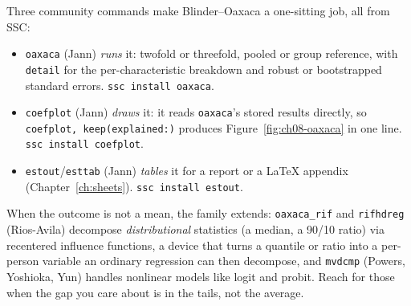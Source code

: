\documentclass[
    a4paper,
    fontsize=10pt,
    twoside=true,
    numbers=noenddot,
]{kaobook}
\begin{document}
\begin{kaobox}[frametitle={SSC toolkit: running, interpreting, and drawing a decomposition}]
Three community commands make Blinder--Oaxaca a one-sitting job, all from SSC:
\begin{itemize}
    \item \texttt{oaxaca} (Jann) \emph{runs} it: twofold or threefold, pooled or group reference, with \texttt{detail} for the per-characteristic breakdown and robust or bootstrapped standard errors. \texttt{ssc install oaxaca}.
    \item \texttt{coefplot} (Jann) \emph{draws} it: it reads \texttt{oaxaca}'s stored results directly, so \texttt{coefplot, keep(explained:)} produces Figure~\ref{fig:ch08-oaxaca} in one line. \texttt{ssc install coefplot}.
    \item \texttt{estout}/\texttt{esttab} (Jann) \emph{tables} it for a report or a \LaTeX{} appendix (Chapter~\ref{ch:sheets}). \texttt{ssc install estout}.
\end{itemize}
When the outcome is not a mean, the family extends: \texttt{oaxaca\_rif} and \texttt{rifhdreg} (Rios-Avila) decompose \emph{distributional} statistics (a median, a 90/10 ratio) via recentered influence functions, a device that turns a quantile or ratio into a per-person variable an ordinary regression can then decompose, and \texttt{mvdcmp} (Powers, Yoshioka, Yun) handles nonlinear models like logit and probit. Reach for those when the gap you care about is in the tails, not the average.
\end{kaobox}
\end{document}
